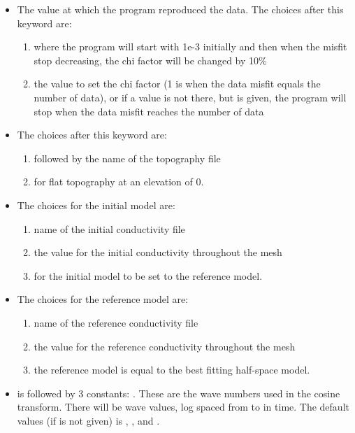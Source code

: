 \begin{itemize}
%
\item [\fileName{CHIFACT}] The value at which the program reproduced the data. The choices after this keyword are: 
\begin{enumerate}
\item{} where the program will start with 1e-3 initially and then when the misfit stop decreasing, the chi factor will be changed by 10\%
\item{} the value to set the chi factor (1 is when the data misfit equals the number of data), or if a value is not there, but  is given, the program will stop when the data misfit reaches the number of data
\end{enumerate}
%
\item[\fileName{TOPO}] The choices after this keyword are:
\begin{enumerate}
\item{} followed by the name of the topography file 
\item{} for flat topography at an elevation of 0.
\end{enumerate}
%
\item[\fileName{INIT\_MOD}] The choices for the initial model are:
\begin{enumerate}
\item{} name of the initial conductivity file
\item{} the value for the initial conductivity throughout the mesh
\item{} for the initial model to be set to the reference model.
\end{enumerate}
%
\item[\fileName{REF\_MOD}] The choices for the reference model are:
\begin{enumerate}
\item{} name of the reference conductivity file
\item{} the value for the reference conductivity throughout the mesh
\item{} the reference model is equal to the best fitting half-space model.
\end{enumerate}
%
\item[\fileName{WAVE}] is followed by 3 constants: . These are the wave numbers used in the cosine transform. There will be  wave values, log spaced from  to  in time. The default values (if  is not given) is , , and .

\end{itemize}
